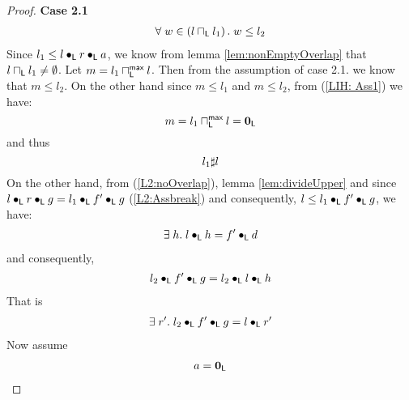 \begin{lemma}[]
\begin{proof}
\noindent\textbf{Case 2.1} 
%
%
\[
\begin{array}{l}
	\forall\; w \in \left(l \sqcap_{\textsf{L}} l_1 \right).\; w \leq l_2 
\end{array}
\]
Since $l_1 \leq l \bullet_{\textsf{L}} r \bullet_{\textsf{L}} a$, we know from lemma \ref{lem:nonEmptyOverlap} that $l \sqcap_{\textsf{L}} l_1 \not= \emptyset$. Let $m = l_1 \sqcap_{\textsf{L}}^{\textsf{max}} l$. Then from the assumption of case 2.1. we know that $m \leq l_2$. On the other hand since $m \leq l_1$ and $m \leq l_2$, from (\ref{LIH: Ass1}) we have:
%
\begin{equation}
	m = l_1 \sqcap_{\textsf{L}}^{\textsf{max}} l = \mathbf{0}_{\textsf{L}} \nonumber
\end{equation} 
%
and thus
%
%
\begin{equation}
	l_1 \sharp l  \label{L2:noOverlap}
\end{equation} 
%
On the other hand, from (\ref{L2:noOverlap}), lemma \ref{lem:divideUpper} and since $l \bullet_{\textsf{L}} r \bullet_{\textsf{L}} g = l_1 \bullet_{\textsf{L}} f' \bullet_{\textsf{L}} g$ (\ref{L2:Assbreak}) and consequently, $l \leq l_1 \bullet_{\textsf{L}} f' \bullet_{\textsf{L}} g$, we have:
%
\begin{align}
	\exists\; h.\; l \bullet_{\textsf{L}} h = f' \bullet_{\textsf{L}} d \nonumber
\end{align}
%
and consequently, 
%
\begin{align}
	l_2 \bullet_{\textsf{L}} f' \bullet_{\textsf{L}} g = l_2 \bullet_{\textsf{L}} l \bullet_{\textsf{L}} h \nonumber
\end{align}
%
That is
%
\begin{align}
	\exists\; r'.\; l_2 \bullet_{\textsf{L}} f' \bullet_{\textsf{L}} g = l \bullet_{\textsf{L}} r' \label{L2:AssPart1}
\end{align}
%
Now assume 
%
\begin{align}
	a = \mathbf{0}_{\textsf{L}} \label{L2:AssUnit}
\end{align}

\end{proof}
\end{lemma}
